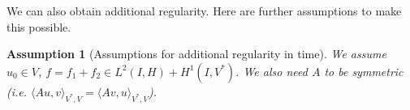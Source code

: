 \documentclass[english,a4paper,9pt,oneside]{scrbook}	%
\theoremstyle{break}
\newtheorem{thm}[equation]{Theorem}
\newtheorem{ass}[equation]{Assumption}
\newenvironment{mproof}[1][\proofname]{%
  \begin{proof}[#1]$ $\par\nobreak\ignorespaces
}{%
  \end{proof}
}
\renewcommand*{\proofname}{Proof}
\theoremstyle{remark}
\newcommand{\norm}[1]{\left\lVert#1\right\rVert}
\newcommand{\VN}[1]{\norm{#1}_{V}}
\newcommand{\VSN}[1]{\norm{#1}_{V^*}}
\begin{document}
\begin{appendices}
We can also obtain additional regularity. Here are further assumptions to make this possible.

\begin{ass}[Assumptions for additional regularity in time]
\label{ass:reg_par}
We assume $u_0 \in V$, $f = f_1+f_2 \in L^2(I,H)+H^1(I,V^*)$. We also need $A$ to be symmetric (i.e. $\langle Au,v \rangle_{V^*,V} = \langle Av,u \rangle_{V^*,V}$).
\end{ass}

%
% 
%
%

%
%
%
%
%
%
%


\end{appendices}
\end{document}
